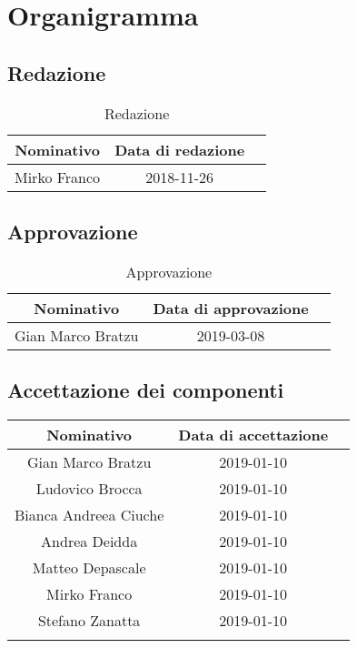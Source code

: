 \chapter{Organigramma}
\section{Redazione}
\label{redazione}
	\begin{table}[htp]
		\centering
			\begin{tabular}{|c|c|c|}
				\hline
				\textbf{Nominativo} & \textbf{Data di redazione} \\
				\hline 
				Mirko Franco & 2018-11-26 \\
				\hline
			\end{tabular}
				\caption{Redazione}
	\end{table}
\section{Approvazione}
\begin{table}[htp]
	\centering
	\begin{tabular}{|c|c|c|}
		\hline
		\textbf{Nominativo} & \textbf{Data di approvazione} \\
		\hline 
		Gian Marco Bratzu & 2019-03-08 \\
		\hline
	\end{tabular}
	\caption{Approvazione}
\end{table}
\clearpage
\section{Accettazione dei componenti}
\label{accettazione}
\begin{tabularx}{\textwidth}{|c|c|c|}
			\hline
			\textbf{Nominativo} & \textbf{Data di accettazione} \\
			\hline 
			Gian Marco Bratzu & 2019-01-10 \\
			Ludovico Brocca & 2019-01-10 \\
			Bianca  Andreea Ciuche & 2019-01-10 \\
			Andrea Deidda & 2019-01-10 \\
			Matteo Depascale & 2019-01-10 \\
	 		Mirko Franco & 2019-01-10 \\
	 		Stefano Zanatta & 2019-01-10 \\
			\hline
		\caption{Accettazione dei componenti}
\end{tabularx}


